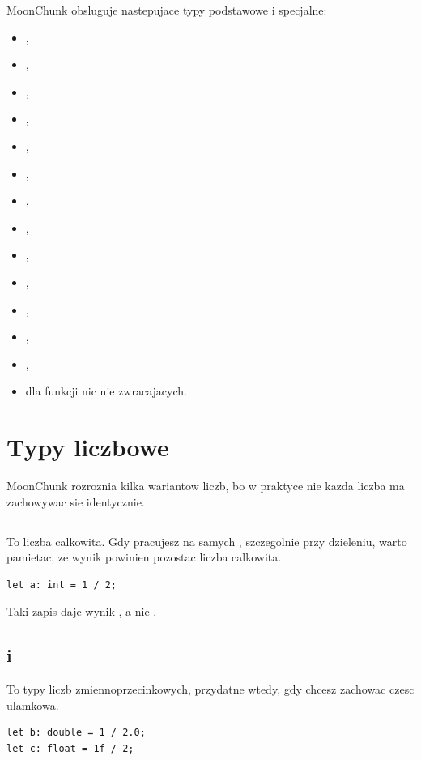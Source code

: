 MoonChunk obsluguje nastepujace typy podstawowe i specjalne:

\begin{itemize}
  \item {},
  \item {},
  \item {},
  \item {},
  \item {},
  \item {},
  \item {},
  \item {},
  \item {},
  \item {},
  \item {},
  \item {},
  \item {},
  \item {} dla funkcji nic nie zwracajacych.
\end{itemize}

\section{Typy liczbowe}
MoonChunk rozroznia kilka wariantow liczb, bo w praktyce nie kazda liczba ma zachowywac
sie identycznie.

\subsection*{}
To liczba calkowita. Gdy pracujesz na samych , szczegolnie przy dzieleniu,
warto pamietac, ze wynik powinien pozostac liczba calkowita.

\begin{lstlisting}[style=moonchunk,caption={Dzielenie liczb typu int}]
let a: int = 1 / 2;
\end{lstlisting}

Taki zapis daje wynik , a nie .

\subsection*{ i }
To typy liczb zmiennoprzecinkowych, przydatne wtedy, gdy chcesz zachowac czesc ulamkowa.

\begin{lstlisting}[style=moonchunk,caption={Dzielenie z czescia ulamkowa}]
let b: double = 1 / 2.0;
let c: float = 1f / 2;
\end{lstlisting}

